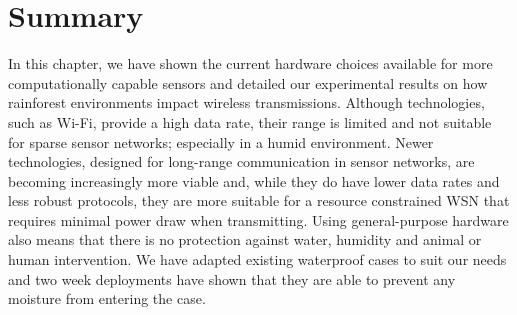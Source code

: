 \section{Summary}
	In this chapter, we have shown the current hardware choices available for more computationally capable sensors and detailed our experimental results on how rainforest environments impact wireless transmissions. Although technologies, such as Wi-Fi, provide a high data rate, their range is limited and not suitable for sparse sensor networks; especially in a humid environment.
	Newer technologies, designed for long-range communication in sensor networks, are becoming increasingly more viable and, while they do have lower data rates and less robust protocols, they are more suitable for a resource constrained WSN that requires minimal power draw when transmitting. 
	Using general-purpose hardware also means that there is no protection against water, humidity and animal or human intervention. We have adapted existing waterproof cases to suit our needs and two week deployments have shown that they are able to prevent any moisture from entering the case.
	 